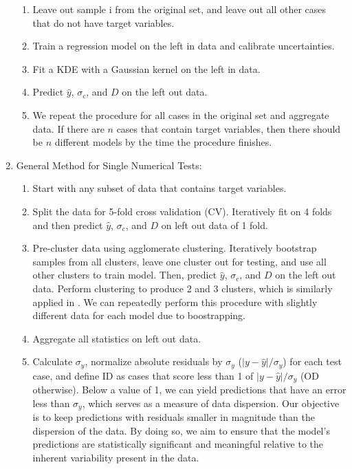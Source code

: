 \begin{enumerate}
        \begin{enumerate}
            \item Leave out sample i from the original set, and leave out all other cases that do not have target variables.
            \item Train a regression model on the left in data and calibrate uncertainties.
            \item Fit a KDE with a Gaussian kernel on the left in data.
            \item Predict $\hat{y}$, $\sigma_{c}$, and $D$ on the left out data.
            \item We repeat the procedure for all cases in the original set and aggregate data. If there are $n$ cases that contain target variables, then there should be $n$ different models by the time the procedure finishes.
        \end{enumerate}

    \item General Method for Single Numerical Tests:

    \begin{enumerate}
        \item Start with any subset of data that contains target variables.
        
        \item Split the data for 5-fold cross validation (CV). Iteratively fit on 4 folds and then predict $\hat{y}$, $\sigma_{c}$, and $D$ on left out data of 1 fold.
        
        \item Pre-cluster data using agglomerate clustering. Iteratively bootstrap samples from all clusters, leave one cluster out for testing, and use all other clusters to train model. Then, predict $\hat{y}$, $\sigma_{c}$, and $D$ on the left out data. Perform clustering to produce 2 and 3 clusters, which is similarly applied in \cite{loco, Meredig2018}. We can repeatedly perform this procedure with slightly different data for each model due to boostrapping.
        
        \item Aggregate all statistics on left out data.
        
        \item Calculate $\sigma_{y}$, normalize absolute residuals by $\sigma_{y}$ ($|y-\hat{y}|/\sigma_{y}$) for each test case, and define ID as cases that score less than 1 of $|y-\hat{y}|/\sigma_{y}$ (OD otherwise). Below a value of 1, we can yield predictions that have an error less than $\sigma_{y}$, which serves as a measure of data dispersion. Our objective is to keep predictions with residuals smaller in magnitude than the dispersion of the data. By doing so, we aim to ensure that the model's predictions are statistically significant and meaningful relative to the inherent variability present in the data.
        

\end{enumerate}
\end{enumerate}
